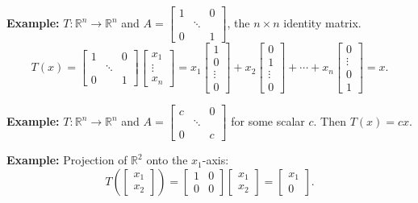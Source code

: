 \documentclass{article}
\begin{document}
\textbf{Example:} $T: \mathbb{R}^n \to \mathbb{R}^n$ and $A = \begin{bmatrix} 1 & & 0 \\ & \ddots & \\ 0 & & 1 \end{bmatrix}$, the $n \times n$ identity matrix.
\[
T(x) = \begin{bmatrix} 1 & & 0 \\ & \ddots & \\ 0 & & 1 \end{bmatrix} \begin{bmatrix} x_1 \\ \vdots \\ x_n \end{bmatrix}
= x_1 \begin{bmatrix} 1 \\ 0 \\ \vdots \\ 0 \end{bmatrix} + x_2 \begin{bmatrix} 0 \\ 1 \\ \vdots \\ 0 \end{bmatrix} + \cdots + x_n \begin{bmatrix} 0 \\ \vdots \\ 0 \\ 1 \end{bmatrix} = x.
\]

\bigskip

\textbf{Example:} $T: \mathbb{R}^n \to \mathbb{R}^n$ and $A = \begin{bmatrix} c & & 0 \\ & \ddots & \\ 0 & & c \end{bmatrix}$ for some scalar $c$. Then $T(x) = cx$.

\newpage

\textbf{Example:} Projection of $\mathbb{R}^2$ onto the $x_1$-axis:
\[
T\left( \begin{bmatrix} x_1 \\ x_2 \end{bmatrix} \right) = \begin{bmatrix} 1 & 0 \\ 0 & 0 \end{bmatrix} \begin{bmatrix} x_1 \\ x_2 \end{bmatrix} = \begin{bmatrix} x_1 \\ 0 \end{bmatrix}.
\]
\end{document}

